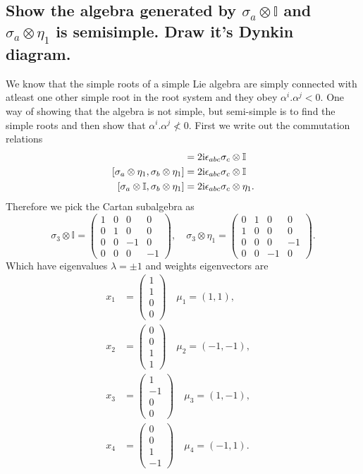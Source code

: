 \documentclass[main.tex]{subfiles}
\begin{document}
\subsection{Show the algebra generated by $\sigma_a\otimes\mathbb{I}$ and $\sigma_a\otimes\eta_1$ is semisimple. Draw it's Dynkin diagram.}\label{Sec:8B}
We know that the simple roots of a simple Lie algebra are simply connected with atleast one other simple root in the root system and they obey $\alpha^i.\alpha^j<0$. One way of showing that the algebra is not simple, but semi-simple is to find the simple roots and then show that $\alpha^i.\alpha^j\nless0$. First we write out the commutation relations
\begin{align}
[\sigma_a\otimes\mathbb{I},\sigma_b\otimes\mathbb{I}]&=2\img\epsilon_{abc}\sigma_c\otimes\mathbb{I}\\
[\sigma_a\otimes\eta_1,\sigma_b\otimes\eta_1]&=2\img\epsilon_{abc}\sigma_c\otimes\mathbb{I}\\
[\sigma_a\otimes\mathbb{I},\sigma_b\otimes\eta_1]&=2\img\epsilon_{abc}\sigma_c\otimes\eta_1.
\end{align}
Therefore we pick the Cartan subalgebra as
\begin{equation}
\sigma_3\otimes\mathbb{I}=\begin{pmatrix}1&0&0&0\\0&1&0&0\\0&0&-1&0\\0&0&0&-1\end{pmatrix},\quad\sigma_3\otimes\eta_1=\begin{pmatrix}0&1&0&0\\1&0&0&0\\0&0&0&-1\\0&0&-1&0\end{pmatrix}.
\end{equation}
Which have eigenvalues $\lambda=\pm1$ and weights eigenvectors are
\begin{align}
x_1&=\begin{pmatrix}1\\1\\0\\0\end{pmatrix} \quad \mu_1=(1,1),\quad\\ 
x_2&=\begin{pmatrix}0\\0\\1\\1\end{pmatrix} \quad \mu_2=(-1,-1),\quad\\
x_3&=\begin{pmatrix}1\\-1\\0\\0\end{pmatrix} \quad \mu_3=(1,-1),\quad\\
x_4&=\begin{pmatrix}0\\0\\1\\-1\end{pmatrix} \quad \mu_4=(-1,1).
\end{align}
\end{document}
